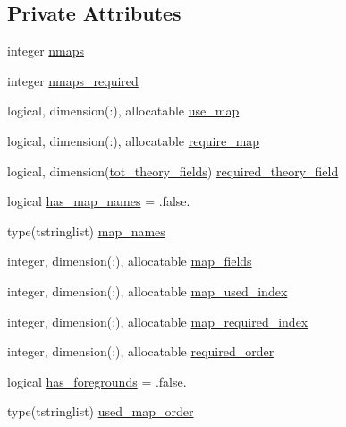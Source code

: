 \subsection*{Private Attributes}
\begin{DoxyCompactItemize}
\item 
integer \mbox{\hyperlink{structcmblikes_1_1tcmblikes_a403e6a4f19209b34481f219064910c1f}{nmaps}}
\item 
integer \mbox{\hyperlink{structcmblikes_1_1tcmblikes_a5a7f3acb4ae487b4eb86d4c5772e3940}{nmaps\+\_\+required}}
\item 
logical, dimension(\+:), allocatable \mbox{\hyperlink{structcmblikes_1_1tcmblikes_a235005ab2cee78be13780289d5981cdd}{use\+\_\+map}}
\item 
logical, dimension(\+:), allocatable \mbox{\hyperlink{structcmblikes_1_1tcmblikes_a8c6f98d9acd5ffc48b36579b29cb55f2}{require\+\_\+map}}
\item 
logical, dimension(\mbox{\hyperlink{namespacecmblikes_a9a7a0c55bde53b41f76027a48c8eb811}{tot\+\_\+theory\+\_\+fields}}) \mbox{\hyperlink{structcmblikes_1_1tcmblikes_adf5875c9242186ccfafcae57403cd52b}{required\+\_\+theory\+\_\+field}}
\item 
logical \mbox{\hyperlink{structcmblikes_1_1tcmblikes_a1ed8c56e51e9256f178a78fd42900f49}{has\+\_\+map\+\_\+names}} = .false.
\item 
type(tstringlist) \mbox{\hyperlink{structcmblikes_1_1tcmblikes_ade65891d52364588279fd326379aadc2}{map\+\_\+names}}
\item 
integer, dimension(\+:), allocatable \mbox{\hyperlink{structcmblikes_1_1tcmblikes_a095ad9f4d31f43a277e67b3a296134c5}{map\+\_\+fields}}
\item 
integer, dimension(\+:), allocatable \mbox{\hyperlink{structcmblikes_1_1tcmblikes_ab183a211d9c7b8cdb04d260f3c443938}{map\+\_\+used\+\_\+index}}
\item 
integer, dimension(\+:), allocatable \mbox{\hyperlink{structcmblikes_1_1tcmblikes_a6d6f267bf4c57af2276156afb57a2914}{map\+\_\+required\+\_\+index}}
\item 
integer, dimension(\+:), allocatable \mbox{\hyperlink{structcmblikes_1_1tcmblikes_addf6e8a96550c6517bc68908f5910683}{required\+\_\+order}}
\item 
logical \mbox{\hyperlink{structcmblikes_1_1tcmblikes_a44ba38f15c7537dd98df23364689fafd}{has\+\_\+foregrounds}} = .false.
\item 
type(tstringlist) \mbox{\hyperlink{structcmblikes_1_1tcmblikes_a4b1dd5a3f9f4da37df7ce0ff23d61744}{used\+\_\+map\+\_\+order}}

\end{DoxyCompactItemize}
